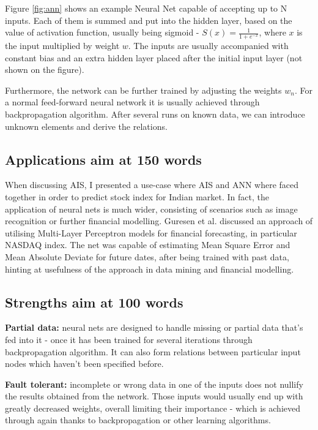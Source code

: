 \documentclass[letterpaper, 10 pt, conference]{ieeeconf}  %
\begin{document}
Figure \ref{fig:ann} shows an example Neural Net capable of accepting up to N inputs. Each of them is summed and put into the hidden layer, based on the value of activation function, usually being sigmoid - \(S(x) = \frac{1}{1+e^{-x}}\), where \(x\) is the input multiplied by weight \(w\). The inputs are usually accompanied with constant bias and an extra hidden layer placed after the initial input layer (not shown on the figure).

Furthermore, the network can be further trained by adjusting the weights \(w_n\). For a normal feed-forward neural network it is usually achieved through backpropagation algorithm. After several runs on known data, we can introduce unknown elements and derive the relations.

\subsection{Applications aim at 150 words}

When discussing AIS, I presented a use-case where AIS and ANN where faced together in order to predict stock index for Indian market. In fact, the application of neural nets is much wider, consisting of scenarios such as image recognition \cite{tsai1995applying} or further financial modelling. Guresen et al. \cite{guresen2011using} discussed an approach of utilising Multi-Layer Perceptron models for financial forecasting, in particular NASDAQ index. The net was capable of estimating Mean Square Error and Mean Absolute Deviate for future dates, after being trained with past data, hinting at usefulness of the approach in data mining and financial modelling.

\subsection{Strengths aim at 100 words}
\textbf{Partial data:} neural nets are designed to handle missing or partial data that's fed into it - once it has been trained for several iterations through backpropagation algorithm. It can also form relations between particular input nodes which haven't been specified before.

\textbf{Fault tolerant:} incomplete or wrong data in one of the inputs does not nullify the results obtained from the network. Those inputs would usually end up with greatly decreased weights, overall limiting their importance - which is achieved through again thanks to backpropagation or other learning algorithms.
\end{document}
